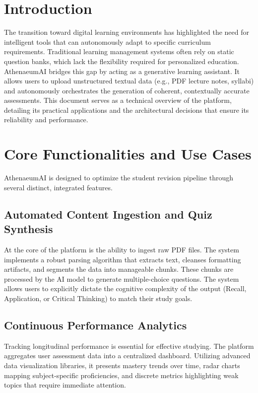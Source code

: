 \documentclass[12pt,a4paper]{article}
\begin{document}
\onehalfspacing

\section{Introduction}
The transition toward digital learning environments has highlighted the need for intelligent tools that can autonomously adapt to specific curriculum requirements. Traditional learning management systems often rely on static question banks, which lack the flexibility required for personalized education. AthenaeumAI bridges this gap by acting as a generative learning assistant. It allows users to upload unstructured textual data (e.g., PDF lecture notes, syllabi) and autonomously orchestrates the generation of coherent, contextually accurate assessments. This document serves as a technical overview of the platform, detailing its practical applications and the architectural decisions that ensure its reliability and performance.

\section{Core Functionalities and Use Cases}
AthenaeumAI is designed to optimize the student revision pipeline through several distinct, integrated features.

\subsection{Automated Content Ingestion and Quiz Synthesis}
At the core of the platform is the ability to ingest raw PDF files. The system implements a robust parsing algorithm that extracts text, cleanses formatting artifacts, and segments the data into manageable chunks. These chunks are processed by the AI model to generate multiple-choice questions. The system allows users to explicitly dictate the cognitive complexity of the output (Recall, Application, or Critical Thinking) to match their study goals.

\subsection{Continuous Performance Analytics}
Tracking longitudinal performance is essential for effective studying. The platform aggregates user assessment data into a centralized dashboard. Utilizing advanced data visualization libraries, it presents mastery trends over time, radar charts mapping subject-specific proficiencies, and discrete metrics highlighting weak topics that require immediate attention.
\end{document}
